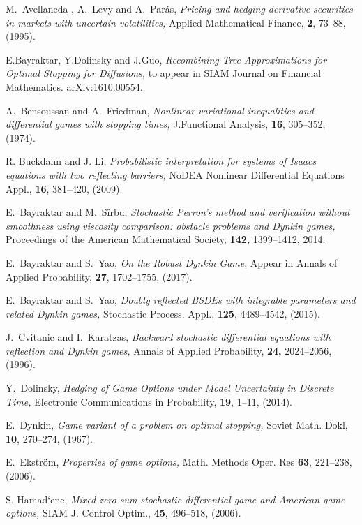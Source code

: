 \documentclass{amsart}
\numberwithin{equation}{section}
\begin{document}
\begin{thebibliography}{99}

M.~Avellaneda , A.~Levy and A.~Par\'{a}s,
{\em
Pricing and hedging derivative securities in markets with uncertain volatilities,}
Applied Mathematical Finance, {\bf 2}, 73--88, (1995).

 E.Bayraktar, Y.Dolinsky and J.Guo,
{\em Recombining Tree Approximations for Optimal Stopping for Diffusions,} to appear in
SIAM Journal on Financial Mathematics.
arXiv:1610.00554.


A.~Bensoussan and A.~Friedman,
{\em Nonlinear variational inequalities and differential games with stopping times,}
J.Functional Analysis, {\bf 16}, 305--352, (1974).


R. Buckdahn and J. Li,
{\em Probabilistic interpretation for systems of Isaacs equations with two reflecting barriers,} NoDEA
Nonlinear Differential Equations Appl., {\bf 16}, 381--420, (2009).

E.~Bayraktar and M.~S\^{i}rbu,
{\em Stochastic Perron's method and verification without smoothness using viscosity comparison: obstacle problems and Dynkin games,}
Proceedings of the American Mathematical Society, {\bf 142,} 1399--1412, 2014.


E.~Bayraktar and S.~Yao,
{\em On the Robust Dynkin Game}, Appear in Annals of
Applied Probability, {\bf 27}, 1702--1755, (2017).

E.~Bayraktar and S.~Yao,
{\em Doubly reflected BSDEs with integrable parameters and related Dynkin games,} Stochastic Process. Appl., {\bf 125},
4489--4542, (2015).


J.~Cvitanic and I.~Karatzas,
{\em Backward stochastic differential equations with reflection and Dynkin games,}
Annals of Applied Probability,  {\bf 24,} 2024--2056, (1996).


Y.~Dolinsky,
{\em Hedging of Game Options under Model Uncertainty in Discrete Time,}
Electronic Communications in Probability, {\bf 19}, 1--11, (2014).

E.~Dynkin,
{\em Game variant of a problem on optimal stopping,}
Soviet Math. Dokl, {\bf 10}, 270--274, (1967).

 E.~Ekstr\"{o}m,
{\em Properties of game options,}
Math. Methods Oper. Res {\bf 63}, 221--238, (2006).

 S. Hamad`ene,
{\em Mixed zero-sum stochastic differential game and American game options,} SIAM J. Control Optim., {\bf 45},
496--518, (2006).


\end{thebibliography}
\end{document}
